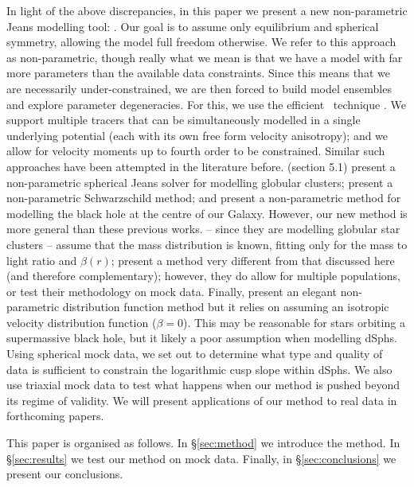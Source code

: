 In light of the above discrepancies, in this paper we present a new
non-parametric Jeans modelling tool: \GravImage. Our goal is to assume only
equilibrium and spherical symmetry, allowing the model full freedom
otherwise. We refer to this approach as non-parametric, though really what we
mean is that we have a model with far more parameters than the available data
constraints. Since this means that we are necessarily under-constrained, we are
then forced to build model ensembles and explore parameter degeneracies. For
this, we use the efficient \MultiNest\ technique \citep{Feroz+2009}. We support
multiple tracers that can be simultaneously modelled in a single underlying
potential (each with its own free form velocity anisotropy); and we allow for
velocity moments up to fourth order to be constrained. Similar such approaches
have been attempted in the literature before. \citet{2011ApJ...738..186I}
(section 5.1) present a non-parametric spherical Jeans solver for modelling
globular clusters; \citet{JardelGebhardt2013} present a non-parametric
Schwarzschild method; and \citet{2001AJ....122..232C} present a non-parametric
method for modelling the black hole at the centre of our Galaxy. However, our
new method is more general than these previous
works. \citet{2011ApJ...738..186I} -- since they are modelling globular star
clusters -- assume that the mass distribution is known, fitting only for the
mass to light ratio and $\beta(r)$; \citet{JardelGebhardt2013} present a method
very different from that discussed here (and therefore complementary); however,
they do allow for multiple populations, or test their methodology on mock
data. Finally, \citet{2001AJ....122..232C} present an elegant non-parametric
distribution function method but it relies on assuming an isotropic velocity
distribution function ($\beta = 0$). This may be reasonable for stars orbiting a
supermassive black hole, but it likely a poor assumption when modelling
dSphs. Using spherical mock data, we set out to determine what type and quality
of data is sufficient to constrain the logarithmic cusp slope within dSphs. We
also use triaxial mock data to test what happens when our method is pushed
beyond its regime of validity. We will present applications of our method to
real data in forthcoming papers.

This paper is organised as follows. In \S\ref{sec:method} we introduce
the method. In \S\ref{sec:results} we test our method on
mock data. Finally, in \S\ref{sec:conclusions} we present our conclusions.

